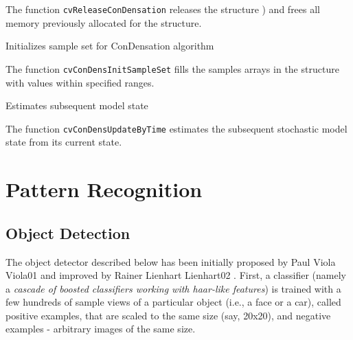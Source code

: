 The function \texttt{cvReleaseConDensation} releases the structure ) and frees all memory previously allocated for the structure.

\label{ConDensInitSampleSet}

Initializes sample set for ConDensation algorithm


\begin{description}
\end{description}

The function \texttt{cvConDensInitSampleSet} fills the samples arrays in the structure  with values within specified ranges.

\label{ConDensUpdateByTime}

Estimates subsequent model state


\begin{description}
\end{description}

The function \texttt{cvConDensUpdateByTime} estimates the subsequent stochastic model state from its current state.

\section{Pattern Recognition}

\subsection{Object Detection}

The object detector described below has been initially proposed by Paul Viola
Viola01
and improved by Rainer Lienhart
Lienhart02
. First, a classifier (namely a \emph{cascade of boosted classifiers working with haar-like features}) is trained with a few hundreds of sample views of a particular object (i.e., a face or a car), called positive examples, that are scaled to the same size (say, 20x20), and negative examples - arbitrary images of the same size.

